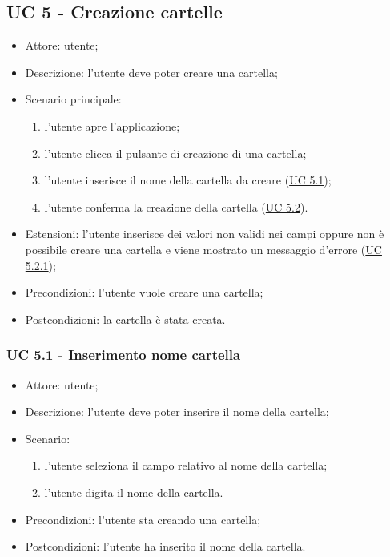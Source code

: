     \subsection{UC 5 - Creazione cartelle}
    \begin{itemize}
        \item Attore: utente;
        \item Descrizione: l'utente deve poter creare una cartella;
        \item Scenario principale:
            \begin{enumerate}
            \item l’utente apre l’applicazione;
            \item l’utente clicca il pulsante di creazione di una cartella;
            \item l'utente inserisce il nome della cartella da creare (\hyperref[sec: UC 5.1]{UC 5.1});
            \item l'utente conferma la creazione della cartella (\hyperref[sec: UC 5.2]{UC 5.2}).            
            \end{enumerate}
        \item Estensioni: l'utente inserisce dei valori non validi nei campi oppure non è possibile creare una cartella e viene mostrato un messaggio d'errore (\hyperref[sec: UC 5.2.1]{UC 5.2.1});
        \item Precondizioni: l'utente vuole creare una cartella;
        \item Postcondizioni: la cartella è stata creata.
    \end{itemize}

    \subsubsection{UC 5.1 - Inserimento nome cartella} \label{sec: UC 5.1}
    \begin{itemize}
        \item Attore: utente;
        \item Descrizione: l'utente deve poter inserire il nome della cartella;
        \item Scenario:
        \begin{enumerate}
        \item l'utente seleziona il campo relativo al nome della cartella;
        \item l'utente digita il nome della cartella.
        \end{enumerate}
        \item Precondizioni: l'utente sta creando una cartella;
        \item Postcondizioni: l'utente ha inserito il nome della cartella.
    \end{itemize}

